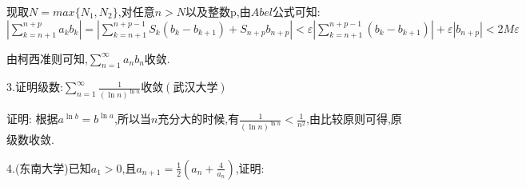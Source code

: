 \documentclass{ctexart}
\begin{document}
\begin{tcolorbox}[title = {综合性问题},colbacktitle=red!25!white,colback=white,arc = 2mm, outer arc = 2mm,fonttitle = \itshape, fontupper = \itshape, fontlower = \itshape]
\begin{tcolorbox}[colback=white,arc = 1mm, outer arc = 1mm,fonttitle = \itshape, fontupper = \itshape, fontlower = \itshape]
   现取$N=max\{N_{1},N_{2}\}$,对任意$n>N$以及整数p,由$Abel$公式可知:
   $\left|\sum\limits_{k=n+1}^{n+p}a_{k}b_{k}\right|=\left|\sum\limits_{k=n+1}^{n+p-1}S_{k}(b_{k}-b_{k+1})+S_{n+p}b_{n+p}\right| < \varepsilon \left|\sum\limits_{k=n+1}^{n+p-1}(b_{k}-b_{k+1})\right| + \varepsilon \left|b_{n+p}\right| <2M \varepsilon$
   
   由柯西准则可知,$\displaystyle{\sum_{n=1}^{\infty}a_{n}b_{n}}$收敛.
\end{tcolorbox}
	3.证明级数:$\displaystyle{\sum_{n=1}^{\infty}\frac{1}{\left(\ln n \right)^{\ln n} }}$收敛$\left(\text{武汉大学}\right) $\\
	
	\begin{tcolorbox}[colback=white,arc = 1mm, outer arc = 1mm,fonttitle = \itshape, fontupper = \itshape, fontlower = \itshape]
		{\color{red}证明:} 根据$\displaystyle{a^{\ln b}=b^{\ln a}}$,所以当$n$充分大的时候,有$\displaystyle{\frac{1}{\left(\ln n \right)^{\ln n} }< \frac{1}{n^{2}}}$,由比较原则可得,原级数收敛.
	\end{tcolorbox}
	4.(东南大学)已知$a_{1} > 0$,且$\displaystyle{a_{n+1}=\frac{1}{2}\left(a_{n}+\frac{4}{a_{n}}\right)}$,证明:\\
	\end{tcolorbox}
\end{document}
